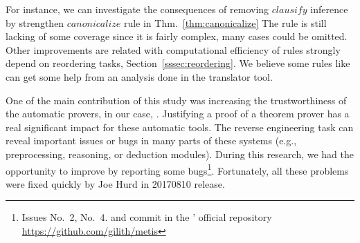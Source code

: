 \documentclass[../main.tex]{subfiles}
\begin{document}
For instance, we can investigate the consequences of removing $clausify$ inference by strengthen $canonicalize$ rule in Thm.~\ref{thm:canonicalize}
The \simplify rule is still lacking of some coverage since it is fairly complex, many cases could be omitted.
Other improvements are related with computational efficiency of
rules strongly depend on reordering tasks,
Section~\ref{sssec:reordering}.
We believe some rules like \canonicalize can get some help from an analysis done in the translator tool.

One of the main contribution of this study was
increasing the trustworthiness of the automatic provers,
in our case, \Metis.
Justifying a proof of a theorem prover
has a real significant impact for these automatic tools.
The reverse engineering task can reveal important issues or bugs
in many parts of these systems (e.g., preprocessing, reasoning, or
deduction modules). During this research, we had the opportunity
to improve \Metis by reporting some bugs\footnote{Issues No.~2,
No.~4. and commit  in the \Metis' official repository
\url{https://github.com/gilith/metis}}.
Fortunately, all these problems were fixed quickly by Joe Hurd in
20170810 release.
\end{document}
